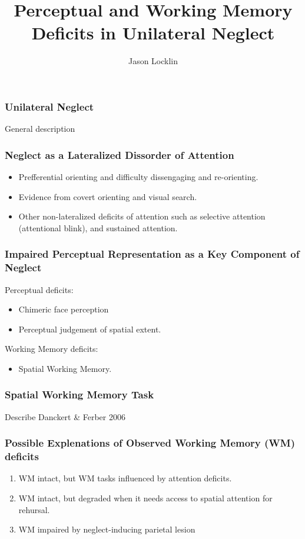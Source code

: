 \documentclass{beamer}
\title[Perception and Working Memory in Neglect]{Perceptual and Working Memory Deficits in Unilateral Neglect}
\subtitle{}
\author{Jason Locklin}
\institute[University of Waterloo]
{Department of Psychology\\
	University of Waterloo\\
	\bigskip
	Supervisor: Dr.\ James Danckert
}
\date[August 6, 2015]
{}%
\begin{document}
\frame{\titlepage}

\section*{}
\begin{frame}
	\frametitle{Unilateral Neglect}
  General description
\end{frame}


\begin{frame}
	\frametitle{Neglect as a Lateralized Dissorder of Attention}
	\begin{itemize}
		\item	Prefferential orienting and difficulty dissengaging and re-orienting.
		\item Evidence from covert orienting and visual search.
		\item Other non-lateralized deficits of attention such as selective attention (attentional blink), and sustained attention.
	\end{itemize}
\end{frame}


\begin{frame}
	\frametitle{Impaired Perceptual Representation as a Key Component of Neglect}
	\begin{block}{Perceptual deficits:}
		\begin{itemize}
			\item Chimeric face perception
			\item Perceptual judgement of spatial extent.
		\end{itemize}
	\end{block}
	\begin{block}{Working Memory deficits:}
		\begin{itemize}
		\item Spatial Working Memory.
		\end{itemize}
	\end{block}
\end{frame}

\begin{frame}
	\frametitle{Spatial Working Memory Task}
	Describe Danckert \& Ferber 2006
\end{frame}

\begin{frame}
	\frametitle{Possible Explenations of Observed Working Memory (WM) deficits}
	\begin{enumerate}
		\item WM intact, but WM tasks influenced by attention deficits.
		\item WM intact, but degraded when it needs access to spatial attention for rehursal.
		\item WM impaired by neglect-inducing parietal lesion
	\end{enumerate}
\end{frame}
\end{document}
